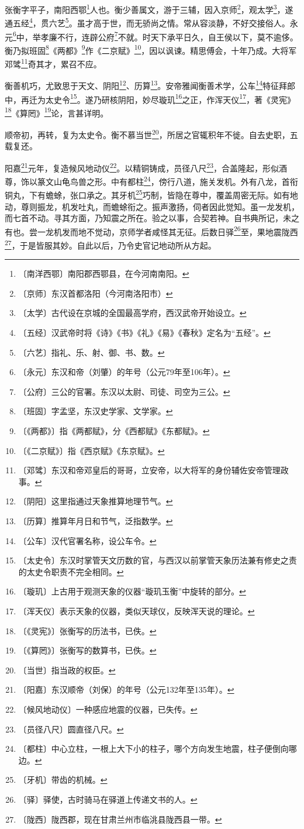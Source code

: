 \documentclass[12pt,UTF-8,openany]{ctexbook}
\begin{document}
\begin{normalsize}
    
    张衡字平子，南阳西鄂\footnote{〔南洋西鄂〕南阳郡西鄂县，在今河南南阳。}人也。衡少善属文，游于三辅，因入京师\footnote{〔京师〕东汉首都洛阳（今河南洛阳市）}，观太学\footnote{〔太学〕古代设在京城的全国最高学府，西汉武帝开始设立。}，遂通五经\footnote{〔五经〕汉武帝时将《诗》《书》《礼》《易》《春秋》定名为“五经”。}，贯六艺\footnote{〔六艺〕指礼、乐、射、御、书、数。}。虽才高于世，而无骄尚之情。常从容淡静，不好交接俗人。永元\footnote{〔永元〕东汉和帝（刘肇）的年号（公元79年至106年）。}中，举孝廉不行，连辟公府\footnote{〔公府〕三公的官署。东汉以太尉、司徒、司空为三公。}不就。时天下承平日久，自王侯以下，莫不逾侈。衡乃拟班固\footnote{〔班固〕字孟坚，东汉史学家、文学家。}《两都》\footnote{〔《两都》〕指《两都赋》，分《西都赋》《东都赋》。}作《二京赋》\footnote{〔《二京赋》〕指《西京赋》《东京赋》。}，因以讽谏。精思傅会，十年乃成。大将军邓骘\footnote{〔邓骘〕东汉和帝邓皇后的哥哥，立安帝，以大将军的身份辅佐安帝管理政事。}奇其才，累召不应。
    
    衡善机巧，尤致思于天文、阴阳\footnote{〔阴阳〕这里指通过天象推算地理节气。}、历算\footnote{〔历算〕推算年月日和节气，泛指数学。}。安帝雅闻衡善术学，公车\footnote{〔公车〕汉代官署名称，设公车令。}特征拜郎中，再迁为太史令\footnote{〔太史令〕东汉时掌管天文历数的官，与西汉以前掌管天象历法兼有修史之责的太史令职责不完全相同。}。遂乃研核阴阳，妙尽璇玑\footnote{〔璇玑〕上古用于观测天象的仪器“璇玑玉衡”中旋转的部分。}之正，作浑天仪\footnote{〔浑天仪〕表示天象的仪器，类似天球仪，反映浑天说的理论。}，著《灵宪》\footnote{〔《灵宪》〕张衡写的历法书，已佚。}《算罔》\footnote{〔《算罔》〕张衡写的数算书，已佚。}论，言甚详明。
    
    顺帝初，再转，复为太史令。衡不慕当世\footnote{〔当世〕指当政的权臣。}，所居之官辄积年不徙。自去史职，五载复还。
    
    阳嘉\footnote{〔阳嘉〕东汉顺帝（刘保）的年号（公元132年至135年）。}元年，复造候风地动仪\footnote{〔候风地动仪〕一种感应地震的仪器，已失传。}。以精铜铸成，员径八尺\footnote{〔员径八尺〕圆直径八尺。}，合盖隆起，形似酒尊，饰以篆文山龟鸟兽之形。中有都柱\footnote{〔都柱〕中心立柱，一根上大下小的柱子，哪个方向发生地震，柱子便倒向哪边。}，傍行八道，施关发机。外有八龙，首衔铜丸，下有蟾蜍，张口承之。其牙机\footnote{〔牙机〕带齿的机械。}巧制，皆隐在尊中，覆盖周密无际。如有地动，尊则振龙，机发吐丸，而蟾蜍衔之。振声激扬，伺者因此觉知。虽一龙发机，而七首不动。寻其方面，乃知震之所在。验之以事，合契若神。自书典所记，未之有也。尝一龙机发而地不觉动，京师学者咸怪其无征。后数日驿\footnote{〔驿〕驿使，古时骑马在驿道上传递文书的人。}至，果地震陇西\footnote{〔陇西〕陇西郡，现在甘肃兰州市临洮县陇西县一带。}，于是皆服其妙。自此以后，乃令史官记地动所从方起。
    

\end{normalsize}
\end{document}
